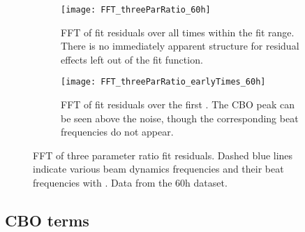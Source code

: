 \begin{figure}[]
\centering
    \begin{subfigure}[t]{0.7\textwidth}
        \centering
        \texttt{[image: FFT\_threeParRatio\_60h]}
        \caption{FFT of fit residuals over all times within the fit range. There is no immediately apparent structure for residual effects left out of the fit function.}
    \end{subfigure}%

    \begin{subfigure}[t]{0.7\textwidth}
        \centering
        \texttt{[image: FFT\_threeParRatio\_earlyTimes\_60h]}
        \caption{FFT of fit residuals over the first . The CBO peak can be seen above the noise, though the corresponding beat frequencies do not appear.}
    \end{subfigure}
\caption[FFT of three parameter ratio fit residuals]{FFT of three parameter ratio fit residuals. Dashed blue lines indicate various beam dynamics frequencies and their beat frequencies with \wa. Data from the 60h dataset.}
\label{fig:fft_threeParamRatio}
\end{figure}




\subsection{CBO terms}
\label{sub:cboterms}


